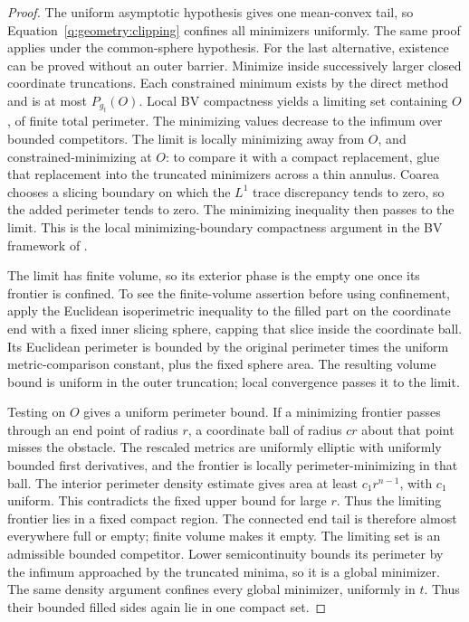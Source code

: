 \begin{proof}
The uniform asymptotic hypothesis gives one mean-convex tail, so
Equation~\eqref{q:geometry:clipping} confines all minimizers uniformly.
The same proof applies under the common-sphere hypothesis. For the
last alternative, existence can be proved without an outer barrier.
Minimize inside successively larger closed coordinate truncations.
Each constrained minimum exists by the direct method and is at most
$P_{g_t}(O)$. Local BV compactness yields a limiting set containing
$O$, of finite total perimeter. The minimizing values decrease to the
infimum over bounded competitors. The limit is locally minimizing
away from $O$, and constrained-minimizing at $O$: to compare it with
a compact replacement, glue that replacement into the truncated
minimizers across a thin annulus. Coarea chooses a slicing boundary
on which the $L^1$ trace discrepancy tends to zero, so the added
perimeter tends to zero. The minimizing inequality then passes to
the limit. This is the local minimizing-boundary compactness argument
in the BV framework of \cite{AmbrosioFuscoPallara2000,Maggi2012}.

The limit has finite volume, so its exterior phase is the empty one
once its frontier is confined. To see the finite-volume assertion
before using confinement, apply the Euclidean isoperimetric inequality
to the filled part on the coordinate end with a fixed inner slicing
sphere, capping that slice inside the coordinate ball. Its Euclidean
perimeter is bounded by the original perimeter times the uniform
metric-comparison constant, plus the fixed sphere area. The resulting
volume bound is uniform in the outer truncation; local convergence
passes it to the limit.

Testing on $O$ gives a uniform perimeter bound. If a minimizing frontier passes through an
end point of radius $r$, a coordinate ball of radius $cr$ about that
point misses the obstacle. The rescaled metrics are uniformly elliptic
with uniformly bounded first derivatives, and the frontier is locally
perimeter-minimizing in that ball. The interior perimeter density
estimate gives area at least $c_1r^{n-1}$, with $c_1$ uniform. This
contradicts the fixed upper bound for large $r$. Thus the limiting
frontier lies in a fixed compact region. The connected end tail is
therefore almost everywhere full or empty; finite volume makes it
empty. The limiting set is an admissible bounded competitor. Lower
semicontinuity bounds its perimeter by the infimum approached by the
truncated minima, so it is a global minimizer. The same density argument
confines every global minimizer, uniformly in $t$. Thus their bounded
filled sides again lie in one compact set.


\end{proof}
